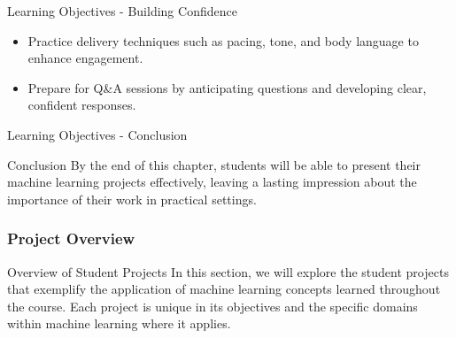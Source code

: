 \documentclass[aspectratio=169]{beamer}
\begin{document}
\begin{frame}[fragile]{Learning Objectives - Building Confidence}
    \begin{itemize}
        \item Practice delivery techniques such as pacing, tone, and body language to enhance engagement.
        \item Prepare for Q\&A sessions by anticipating questions and developing clear, confident responses.
    \end{itemize}
\end{frame}

\begin{frame}[fragile]{Learning Objectives - Conclusion}
    \begin{block}{Conclusion}
        By the end of this chapter, students will be able to present their machine learning projects effectively, leaving a lasting impression about the importance of their work in practical settings.
    \end{block}
\end{frame}

\begin{frame}[fragile]
    \frametitle{Project Overview}
    \begin{block}{Overview of Student Projects}
        In this section, we will explore the student projects that exemplify the application of machine learning concepts learned throughout the course. Each project is unique in its objectives and the specific domains within machine learning where it applies.
    \end{block}
\end{frame}
\end{document}
